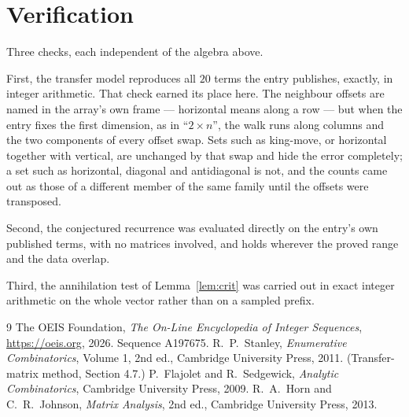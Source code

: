 \documentclass[11pt,a4paper]{article}
\theoremstyle{plain}
\theoremstyle{definition}
\begin{document}
\section{Verification}

Three checks, each independent of the algebra above.

First, the transfer model reproduces all $20$ terms the entry publishes, exactly, in
integer arithmetic. That check earned its place here. The neighbour offsets are named in the
array's own frame --- horizontal means along a row --- but when the entry fixes the first
dimension, as in ``$2\times n$'', the walk runs along columns and the two components of every
offset swap. Sets such as king-move, or horizontal together with vertical, are unchanged by
that swap and hide the error completely; a set such as horizontal, diagonal and antidiagonal
is not, and the counts came out as those of a different member of the same family until the
offsets were transposed.

Second, the conjectured recurrence was evaluated directly on the entry's own published terms,
with no matrices involved, and holds wherever the proved range and the data overlap.

Third, the annihilation test of Lemma~\ref{lem:crit} was carried out in exact integer
arithmetic on the whole vector rather than on a sampled prefix.

\begin{thebibliography}{9}
 The OEIS Foundation, \emph{The On-Line Encyclopedia of Integer
Sequences}, \url{https://oeis.org}, 2026. Sequence A197675.
 R.~P.~Stanley, \emph{Enumerative Combinatorics}, Volume 1, 2nd ed.,
Cambridge University Press, 2011. (Transfer-matrix method, Section 4.7.)
 P.~Flajolet and R.~Sedgewick, \emph{Analytic Combinatorics}, Cambridge
University Press, 2009.
 R.~A.~Horn and C.~R.~Johnson, \emph{Matrix Analysis}, 2nd ed., Cambridge
University Press, 2013.
\end{thebibliography}
\end{document}
